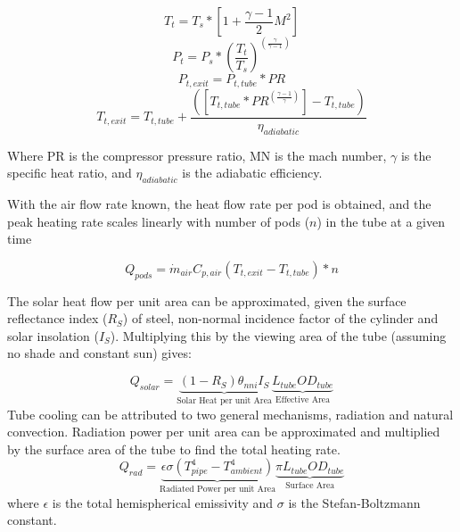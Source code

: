 \documentclass[heading.tex]{subfiles}
\begin{document}
\begin{equation}
T_{t} = T_{s} * [1 + \frac{\gamma -1}{2} M^2]
\end{equation}
\begin{equation}
P_{t} = P_{s} * \left(\frac{ T_{t}}{T_{s}}\right)^{(\frac{\gamma}{\gamma -1})}
\end{equation}
\begin{equation}
P_{t,exit} = P_{t,tube} * PR
\end{equation}
\begin{equation}
T_{t,exit} = T_{t,tube} + \frac{([T_{t,tube}*PR^{(\frac{\gamma-1}{\gamma})}] - T_{t,tube})}  {{\eta}_{adiabatic}}
\end{equation}

Where PR is the compressor pressure ratio, MN is the mach number, 
$\gamma$ is the specific heat ratio, and  ${\eta}_{adiabatic}$ is the adiabatic efficiency.

With the air flow rate known, the heat flow rate per pod is obtained, 
and the peak heating rate scales linearly with number of pods ($n$) in the tube at a given time

\begin{equation}
{Q}_{pods}= \dot{m}_{air} C_{p,air} (T_{t,exit} - T_{t,tube}) * n
\end{equation}

The solar heat flow per unit area can be approximated,
given the surface reflectance index ($R_{S}$) of steel, non-normal incidence factor
of the cylinder and solar insolation ($I_{S}$).
Multiplying this by the viewing area of the tube
(assuming no shade and constant sun) gives:


\begin{equation}
Q_{solar} = \underbrace{ (1-R_{S})  {\theta}_{nni}  I_{S}}_\text{Solar Heat per unit Area} \underbrace{L_{tube}  OD_{tube}}_\text{Effective Area}
\end{equation}
Tube cooling can be attributed to two general mechanisms, radiation and natural convection.
Radiation power per unit area can be
approximated and multiplied by the surface area of the tube to find the total heating rate.
\begin{equation}
Q_{rad} = \underbrace{\epsilon \sigma (T_{pipe}^4 - T_{ambient}^4)}_\text{Radiated Power per unit Area}\underbrace{\pi L_{tube} OD_{tube}}_\text{Surface Area}
\end{equation}
where  $\epsilon$ is the total hemispherical emissivity and
$\sigma$ is the Stefan-Boltzmann constant.
\end{document}
